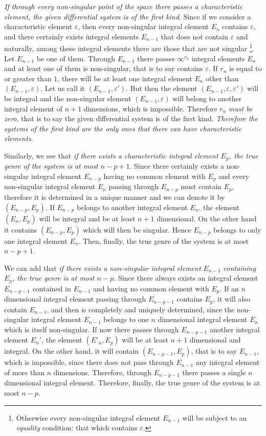 \documentclass[leqno,11pt]{book}
\makeatletter
\theoremstyle{shape1}
\theoremstyle{shapesmall}
\let\old@epsilon\epsilon
\let\old@varepsilon\varepsilon
\let\epsilon\old@varepsilon
\let\varepsilon\old@epsilon
\makeatother
\begin{document}
\emph{If through every non-singular point of the space there passes a characteristic element, the given differential system is of the first kind}. Since if we consider a characteristic element $\epsilon$, then every non-singular integral element $E_{n}$ contains $\epsilon$,  and there certainly exists integral elements $E_{n-1}$ that does not contain $\epsilon$ and naturally, among these integral elements there are those that are not singular \footnote{Otherwise every non-singular integral element $E_{n-1}$ will be subject to an \emph{equality} condition: that which contains $\epsilon$.}. Let $E_{n-1}$ be one of them. Through $E_{n-1}$ there passes $\infty^{r_{n}}$ integral elements $E_{n}$ and at least one of them is non-singular, that is to say contains $\epsilon$. If $r_{n}$ is equal to or greater than $1$, there will be at least one integral element $E_{n}$ other than $(E_{n-1},\epsilon)$. Let us call it $(E_{n-1},\epsilon')$. But then the element $(E_{n-1},\epsilon,\epsilon')$ will be integral and the non-singular element $(E_{n-1},\epsilon)$ will belong to another integral element of $n+1$ dimensions, which is impossible. Therefore $r_{n}$ \emph{must be zero}, that is to say the given differential system is of the first kind. \emph{Therefore the systems of the first kind are the only ones that there can have characteristic elements.}

Similarly, we see that \emph{if there exists a characteristic integral element $E_{p}$, the true genre of the system is at most $n-p+1$}. Since there certainly exists a non-singular integral element $E_{n-p}$ having no common element with $E_{p}$ and every non-singular integral element $E_{n}$ passing through $E_{n-p}$ must contain $E_{p}$, therefore it is determined in a unique manner and we can denote it by $(E_{n-p}, E_{p})$. If $E_{n-p}$ belongs to another integral element $E_{n}$, the element $(E_{n},E_{p})$ will be integral and be at least $n+1$ dimensional. On the other hand it contains $(E_{n-p},E_{p})$ which will then be singular. Hence $E_{n-p}$ belongs to only one integral element $E_{n}$. Then, finally, the true genre of the system is at most $n-p+1$.

We can add that \emph{if there exists a non-singular integral element $E_{n-1}$ containing $E_{p}$, the true genre is at most $n-p$.} Since there always exists an integral element $E_{n-p-1}$ contained in $E_{n-1}$ and having no common element with $E_{p}$. If an $n$ dimensional integral element passing through $E_{n-p-1}$ contains $E_{p}$, it will also contain $E_{n-1}$, and then is completely and uniquely determined, since the non-singular integral element $E_{n-1}$ belongs to one $n$ dimensional integral element $E_{n}$ which is itself non-singular. If now there passes through $E_{n-p-1}$ another integral element $E_{n}'$, the element $(E'_{n},E_{p})$ will be at least $n+1$ dimensional and integral. On the other hand, it will contain $(E_{n-p-1},E_{p})$, that is to say $E_{n-1}$, which is impossible, since there does not pass through $E_{n-1}$ any integral element of more than $n$ dimensions. Therefore, through $E_{n-p-1}$ there passes a single $n$ dimensional integral element. Therefore, finally, the true genre of the system is at most $n-p$.
\end{document}
